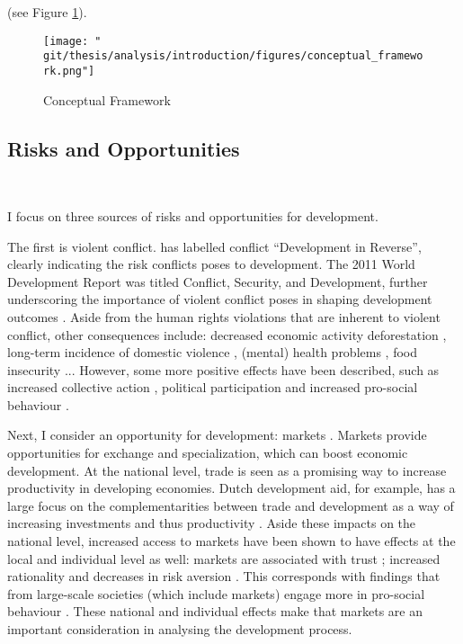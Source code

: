  (see Figure \ref{intro:fig:framework}).

\begin{figure}[htb]
  \centering
  \texttt{[image: "\\git/thesis/analysis/introduction/figures/conceptual\_framework.png"]}
  \caption{Conceptual Framework}
  \label{intro:fig:framework}
\end{figure}
\subsection{Risks and Opportunities}\

I focus on three sources of risks and opportunities for development. 

The first is violent conflict.  \citet{Collier2003} has labelled conflict ``Development in Reverse'', clearly indicating the risk conflicts poses to development. The 2011 World Development Report was titled Conflict, Security, and Development, further underscoring the importance of violent conflict poses in shaping development outcomes \citep{WorldBank2011}. Aside from the human rights violations that are inherent to violent conflict, other consequences include: decreased economic activity \citep{Collier1999} deforestation \cite[e.g.][]{Connectiona}, long-term incidence of domestic violence \citep[e.g.][]{LaMattina2017; Muller2019}, (mental) health problems \cite[e.g.][]{Smith2002; Iqbal2006a;Akresh2011}, food insecurity \cite[e.g.][]{Lecoutere2005; Verwimp2012}... However, some more positive effects have been described, such as increased collective action \citep{Bellows2009b}, political participation \citep{Blattman2009a} and increased pro-social behaviour \citep{Voors2012a}.

Next, I consider an opportunity for development: markets . Markets provide opportunities for exchange and specialization, which can boost economic development. At the national level, trade is seen as a promising way to increase productivity in developing economies. Dutch development aid, for example, has a large focus on the complementarities between trade and development as a way of increasing investments and thus productivity \citep[see e.g.][]{Zoomers2014}. Aside these impacts on the national level, increased access to markets have been shown to have effects at the local and individual level as well: markets are associated with trust \citep{Tu2010,Fischer2008}; increased rationality \citep{List2008,Cecchi2013,Braga2009} and decreases in risk aversion \citep{Melesse2015}. This corresponds with findings that from large-scale societies (which include markets) engage more in pro-social behaviour \cite{Henrich2005,Henrich2010}. These national and individual effects make that markets are an important consideration in analysing the development process.


